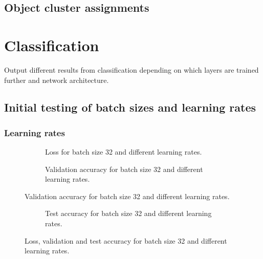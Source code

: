 

\subsection{Object cluster assignments}



%

\section{Classification}
Output different results from classification depending on which layers are trained further and network architecture.

\subsection{Initial testing of batch sizes and learning rates}

\subsubsection{Learning rates}

\begin{figure}
	\begin{subfigure}[b]{\textwidth}
		
		\caption{Loss for batch size 32 and different learning rates.}
	\end{subfigure}

	\begin{subfigure}[b]{\textwidth}
		
		\caption{Validation accuracy for batch size 32 and different learning rates.}
	\end{subfigure}
\end{figure}

\begin{figure}
	\ContinuedFloat
	\begin{subfigure}[b]{\textwidth}
		
		\caption{Test accuracy for batch size 32 and different learning rates.}
	\end{subfigure}
	\caption{Loss, validation and test accuracy for batch size 32 and different learning rates.}
\end{figure}


